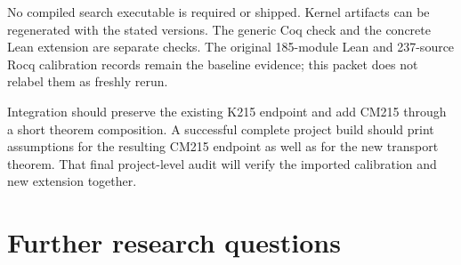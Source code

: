 \documentclass[11pt,letterpaper]{article}
\theoremstyle{definition}
\begin{document}
No compiled search executable is required or shipped. Kernel artifacts
can be regenerated with the stated versions. The generic Coq check and
the concrete Lean extension are separate checks. The original
185-module Lean and 237-source Rocq calibration records remain the
baseline evidence; this packet does not relabel them as freshly rerun.

Integration should preserve the existing K215 endpoint and add CM215
through a short theorem composition. A successful complete project
build should print assumptions for the resulting CM215 endpoint as
well as for the new transport theorem. That final project-level audit
will verify the imported calibration and new extension together.

\section{Further research questions}
\end{document}
